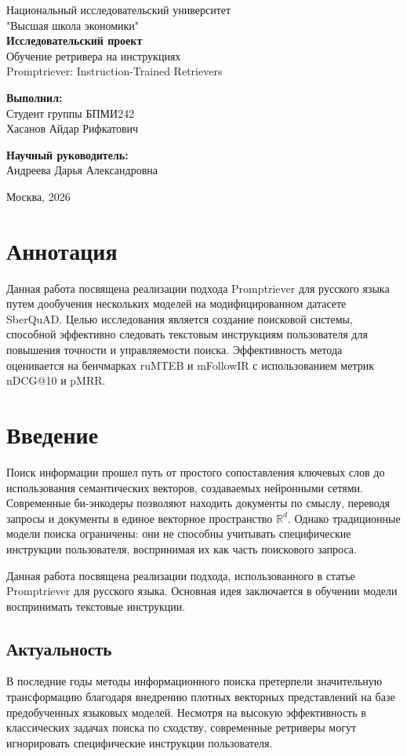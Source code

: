 \documentclass[12pt, a4paper, oneside]{article}
\newcommand{\MyUniversity}{Национальный исследовательский университет \\ "Высшая школа экономики"}
\newcommand{\MyProjectText}{Исследовательский проект}
\newcommand{\MyTopicText}{Обучение ретривера на инструкциях}
\newcommand{\MyTopicTextEn}{Promptriever: Instruction-Trained Retrievers}
\newcommand{\MyStudentGroup}{БПМИ242}
\newcommand{\MyStudentName}{Хасанов Айдар Рифкатович}
\newcommand{\MySupervisorName}{Андреева Дарья Александровна}
\newcommand{\MyCityYear}{Москва, 2026}
\newcommand{\maketitlepage}{
    \thispagestyle{empty}
    \begin{center}
        \vspace*{\fill}
        
        \vspace{0.5em}
        {\Large \MyUniversity\\}
        \vspace{4cm}
        {\Large \textbf{\MyProjectText}\\}
        {\large \MyTopicText\\}
        {\large \MyTopicTextEn\\}
        \vspace{2cm}
        
        \begin{minipage}{0.9\textwidth}
            \flushright
            \large
            \textbf{Выполнил:}\\
            Студент группы \MyStudentGroup\\
            \MyStudentName
        \end{minipage}
        
        \vspace{3em}

        \begin{minipage}{0.9\textwidth}
            \flushright 
            \large
            \textbf{Научный руководитель:}\\
            \MySupervisorName
        \end{minipage}
        
        \vspace{4cm}
        {\large \MyCityYear}
        \vspace*{\fill}
    \end{center}
    \newpage
}
\begin{document}
\maketitlepage


\tableofcontents
\newpage

\section*{Аннотация}


Данная работа посвящена реализации подхода Promptriever для русского языка 
путем дообучения нескольких моделей на модифицированном датасете SberQuAD. Целью исследования
является создание поисковой системы, способной эффективно следовать текстовым инструкциям пользователя для 
повышения точности и управляемости поиска. Эффективность метода оценивается на бенчмарках ruMTEB и 
mFollowIR с использованием метрик nDCG@10 и pMRR.

\newpage

\setcounter{page}{1}

\section{Введение}
\label{sec:vvedenie}
Поиск информации прошел путь от простого сопоставления ключевых слов до использования семантических векторов, создаваемых нейронными сетями. Современные би-энкодеры позволяют находить документы по смыслу, переводя запросы и документы в единое векторное пространство $\mathbb{R}^d$. 
Однако традиционные модели поиска ограничены: они не способны учитывать специфические инструкции пользователя, воспринимая их как часть поискового запроса.

Данная работа посвящена реализации подхода, использованного в статье Promptriever \cite{weller2024promptriever} для русского языка. Основная идея заключается в обучении модели воспринимать текстовые инструкции. 

\subsection{Актуальность}

В последние годы методы информационного поиска претерпели значительную трансформацию благодаря внедрению плотных векторных представлений 
на базе предобученных языковых моделей. Несмотря на высокую эффективность в классических задачах поиска по сходству, 
современные ретриверы могут игнорировать специфические инструкции пользователя.
\end{document}
